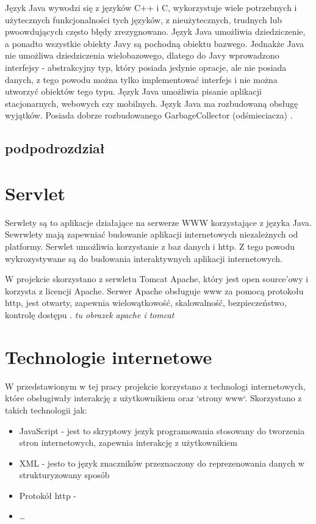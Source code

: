 \documentclass[eng,printmode,oneside]{mgr}
\begin{document}
Język Java wywodzi się z języków C++ i C, wykorzystuje wiele potrzebnych i
użytecznych funkcjonalności tych języków, z nieużytecznych, trudnych lub
pwoowdujących często błędy zrezygnowano. Język Java umożliwia dziedziczenie, a ponadto wszystkie obiekty Javy
są pochodną obiektu bazwego. Jednakże Java nie umożliwa dziedziczenia wielobazowego, dlatego do Javy wprowadzono interfejsy - abstrakcyjny typ, który posiada jedynie opracje, ale
nie posiada danych, z tego powodu można tylko implementować interfejs i nie
można utworzyć obiektów tego typu. Język Java umożliwia pisanie aplikacji
stacjonarnych, webowych czy mobilnych. Język Java ma rozbudowaną obsługę
wyjątków. Posiada dobrze rozbudowanego GarbageCollector (odśmieciacza)
\cite{java.doc}.
\subsection{podpodrozdział}

\section{Servlet}

Serwlety są to aplikacje działające na serwerze WWW korzystające z języka Java.
Sewrwlety mają zapewniać budowanie aplikacji internetowych niezależnych od
platformy. Serwlet umożliwia korzystanie z baz danych i http. Z tego powodu
wykrozystywane są do budowania interaktywnych aplikacji internetowych. 

W projekcie skorzystano z serwletu Tomcat Apache, który jest open source'owy i
korzysta z licencji Apache. Serwer Apache obsługuje www za pomocą protokołu
http, jest otwarty, zapewnia wielowątkowość, skalowalność, bezpieczeństwo,
kontrolę dostępu \cite{apache.wiki}. \emph{\color{komentarz} tu obrazek apache i
tomcat \cite{apache.tomcat}}

\section{Technologie internetowe}

W przedstawionym w tej pracy projekcie korzystano z technologi internetowych,
które obsługiwały interakcję z użytkownikiem oraz `strony www`. Skorzystano
z takich technologii jak:
\begin{itemize}
  \item JavaScript - jest to skryptowy jezyk programowania stosowany do
  tworzenia stron internetowych, zapewnia interakcję z użytkownikiem\cite{javascript.wiki}
  \item XML - jesto to język znaczników przeznaczony do reprezenowania danych w
  strukturyzowany sposób \cite{xml.wiki}
  \item Protokół http - 
  \item \ldots
\end{itemize}
\end{document}
